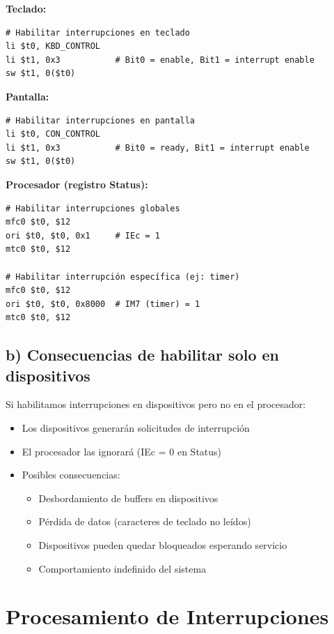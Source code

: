 \documentclass[12pt,a4paper]{article}
\begin{document}
\textbf{Teclado:}
\begin{lstlisting}[style=mipsstyle]
# Habilitar interrupciones en teclado
li $t0, KBD_CONTROL
li $t1, 0x3           # Bit0 = enable, Bit1 = interrupt enable
sw $t1, 0($t0)
\end{lstlisting}

\textbf{Pantalla:}
\begin{lstlisting}[style=mipsstyle]
# Habilitar interrupciones en pantalla
li $t0, CON_CONTROL
li $t1, 0x3           # Bit0 = ready, Bit1 = interrupt enable
sw $t1, 0($t0)
\end{lstlisting}

\textbf{Procesador (registro Status):}
\begin{lstlisting}[style=mipsstyle]
# Habilitar interrupciones globales
mfc0 $t0, $12
ori $t0, $t0, 0x1     # IEc = 1
mtc0 $t0, $12

# Habilitar interrupción específica (ej: timer)
mfc0 $t0, $12
ori $t0, $t0, 0x8000  # IM7 (timer) = 1
mtc0 $t0, $12
\end{lstlisting}

\subsection{b) Consecuencias de habilitar solo en dispositivos}
Si habilitamos interrupciones en dispositivos pero no en el procesador:
\begin{itemize}
    \item Los dispositivos generarán solicitudes de interrupción
    \item El procesador las ignorará (IEc = 0 en Status)
    \item Posibles consecuencias:
    \begin{itemize}
        \item Desbordamiento de buffers en dispositivos
        \item Pérdida de datos (caracteres de teclado no leídos)
        \item Dispositivos pueden quedar bloqueados esperando servicio
        \item Comportamiento indefinido del sistema
    \end{itemize}
\end{itemize}

\section{Procesamiento de Interrupciones}
\end{document}
